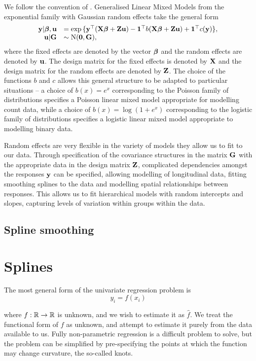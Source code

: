 \documentclass{amsart}[12pt]
\begin{document}
We follow the convention of \citep{Zhao2006}. Generalised Linear Mixed Models from the exponential family with
Gaussian random effects take the general form
$$
\begin{array}{rl}
	{\bf y} | {\boldsymbol \beta}, {\bf u} &= \exp{\{ {\bf y}^\top ({\bf X}{\boldsymbol\beta}+ {\bf Z}{\bf u}) - {\bf1}^\top b({\bf X}{\boldsymbol\beta}+ {\bf Z}{\bf u}) + {\bf1}^\top c({\bf y}) \}}, \\
	{\bf u} | {\bf G} &\sim \text{N}({\bf 0}, {\bf G}),
\end{array}
$$
where the fixed effects are denoted by the vector ${\boldsymbol \beta}$ and the random effects are denoted by ${\bf u}$. The
design matrix for the fixed effects is denoted by ${\bf X}$ and the design matrix for the random effects are
denoted by ${\bf Z}$. The choice of the functions $b$ and $c$ allows this general structure to be adapted to
particular situations -- a choice of $b(x) = e^x$ corresponding to the Poisson family of distributions
specifies a Poisson linear mixed model appropriate for modelling count data, while a choice of $b(x) = \log(1
+ e^x)$ corresponding to the logistic family of distributions specifies a logistic linear mixed model
appropriate to modelling binary data.

Random effects are very flexible in the variety of models they allow us to fit to our data. Through
specification of the covariance structures in the matrix ${\bf G}$ with the appropriate data in the design matrix
${\bf Z}$, complicated dependencies amongst the responses ${\bf y}$ can be specified, allowing modelling of
longitudinal data, fitting smoothing splines to the data and modelling spatial relationships between
responses. This allows us to fit hierarchical models with random intercepts and slopes, capturing levels of variation within groups within the data.
\citep{Gelman2007}

\subsection{Spline smoothing}
\section{Splines}
The most general form of the univariate regression problem is
\[
	y_i = f(x_i)
\]

where $f: {\mathbb{R}} \to {\mathbb{R}}$ is unknown, and we wish to estimate it as $\hat{f}$. We treat the functional form of
$f$ as unknown, and attempt to estimate it purely from the data available to us. Fully non-parametric regression
is a difficult problem to solve, but the problem can be simplified by pre-specifying the points at which the
function may change curvature, the so-called knots.
\end{document}
